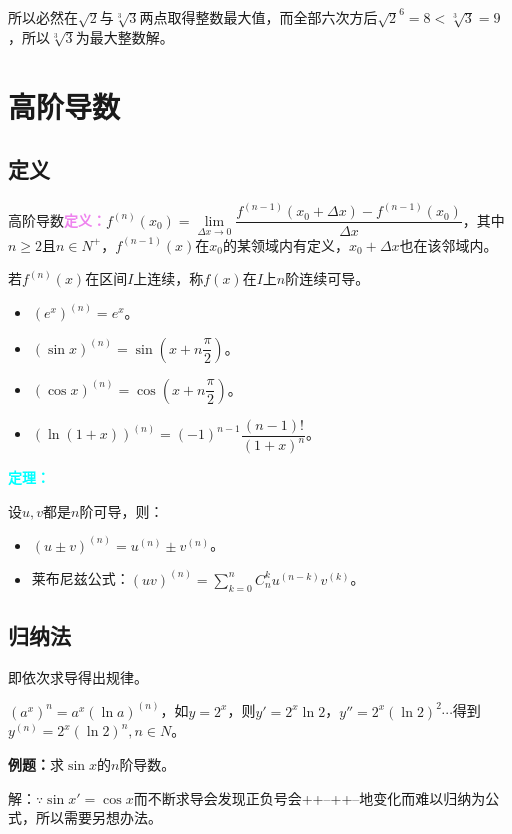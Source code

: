 \documentclass[UTF8, 12pt]{ctexart}
\begin{document}
所以必然在$\sqrt{2}$与$\sqrt[3]{3}$两点取得整数最大值，而全部六次方后$\sqrt{2}^6=8<\sqrt[3]{3}=9$，所以$\sqrt[3]{3}$为最大整数解。

\section{高阶导数}

\subsection{定义}

高阶导数\textcolor{violet}{\textbf{定义：}}$f^{(n)}(x_0)=\lim\limits_{\Delta x\to 0}\dfrac{f^{(n-1)}(x_0+\Delta x)-f^{(n-1)}(x_0)}{\Delta x}$，其中$n\geqslant 2$且$n\in N^+$，$f^{(n-1)}(x)$在$x_0$的某领域内有定义，$x_0+\Delta x$也在该邻域内。

若$f^{(n)}(x)$在区间$I$上连续，称$f(x)$在$I$上$n$阶连续可导。

\begin{itemize}
    \item $(e^x)^{(n)}=e^x$。
    \item $(\sin x)^{(n)}=\sin(x+n\dfrac{\pi}{2})$。
    \item $(\cos x)^{(n)}=\cos(x+n\dfrac{\pi}{2})$。
    \item $(\ln(1+x))^{(n)}=(-1)^{n-1}\dfrac{(n-1)!}{(1+x)^n}$。
\end{itemize}

\textcolor{aqua}{\textbf{定理：}}

设$u,v$都是$n$阶可导，则：

\begin{itemize}
    \item $(u\pm v)^{(n)}=u^{(n)}\pm v^{(n)}$。
    \item 莱布尼兹公式：$(uv)^{(n)}=\sum_{k=0}^nC_n^ku^{(n-k)}v^{(k)}$。
\end{itemize}

\subsection{归纳法}

即依次求导得出规律。

$(a^x)^n=a^x(\ln a)^{(n)}$，如$y=2^x$，则$y'=2^x\ln 2$，$y''=2^x(\ln 2)^2\cdots$得到$y^{(n)}=2^x(\ln 2)^n,n\in N$。

\textbf{例题：}求$\sin x$的$n$阶导数。

解：$\because \sin x'=\cos x$而不断求导会发现正负号会++--++--地变化而难以归纳为公式，所以需要另想办法。
\end{document}
